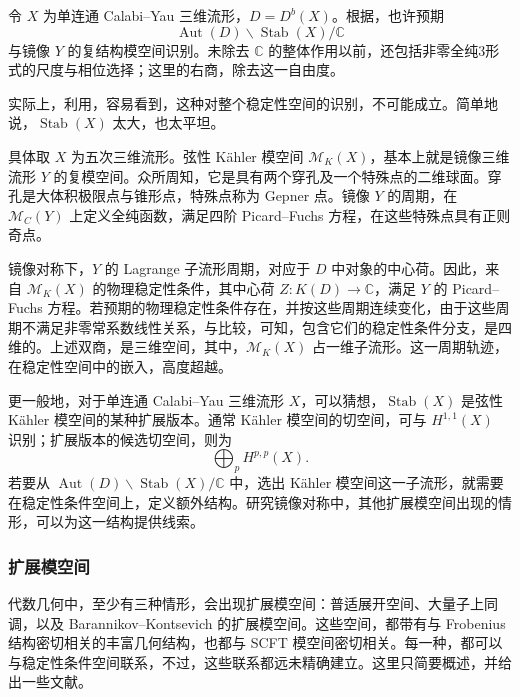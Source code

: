 令 $X$ 为单连通 Calabi--Yau 三维流形，$D=D^b(X)$。根据，也许预期
\[
\operatorname{Aut}(D)\backslash\operatorname{Stab}(X)/\mathbb{C}
\]
与镜像 $Y$ 的复结构模空间识别。未除去 $\mathbb{C}$ 的整体作用以前，还包括非零全纯3形式的尺度与相位选择；这里的右商，除去这一自由度。

实际上，利用，容易看到，这种对整个稳定性空间的识别，不可能成立。简单地说，$\operatorname{Stab}(X)$ 太大，也太平坦。

具体取 $X$ 为五次三维流形。弦性 K\"ahler 模空间 $\mathcal{M}_K(X)$，基本上就是镜像三维流形 $Y$ 的复模空间。众所周知，它是具有两个穿孔及一个特殊点的二维球面。穿孔是大体积极限点与锥形点，特殊点称为 Gepner 点。镜像 $Y$ 的周期，在 $\mathcal{M}_C(Y)$ 上定义全纯函数，满足四阶 Picard--Fuchs 方程，在这些特殊点具有正则奇点。

镜像对称下，$Y$ 的 Lagrange 子流形周期，对应于 $D$ 中对象的中心荷。因此，来自 $\mathcal{M}_K(X)$ 的物理稳定性条件，其中心荷 $Z\colon K(D)\to\mathbb{C}$，满足 $Y$ 的 Picard--Fuchs 方程。若预期的物理稳定性条件存在，并按这些周期连续变化，由于这些周期不满足非零常系数线性关系，与比较，可知，包含它们的稳定性条件分支，是四维的。上述双商，是三维空间，其中，$\mathcal{M}_K(X)$ 占一维子流形。这一周期轨迹，在稳定性空间中的嵌入，高度超越。

更一般地，对于单连通 Calabi--Yau 三维流形 $X$，可以猜想，$\operatorname{Stab}(X)$ 是弦性 K\"ahler 模空间的某种扩展版本。通常 K\"ahler 模空间的切空间，可与 $H^{1,1}(X)$ 识别；扩展版本的候选切空间，则为
\[
\bigoplus_p H^{p,p}(X).
\]
若要从 $\operatorname{Aut}(D)\backslash\operatorname{Stab}(X)/\mathbb{C}$ 中，选出 K\"ahler 模空间这一子流形，就需要在稳定性条件空间上，定义额外结构。研究镜像对称中，其他扩展模空间出现的情形，可以为这一结构提供线索。

\subsubsection{扩展模空间}\label{sec:5.9.1.3}

代数几何中，至少有三种情形，会出现扩展模空间：普适展开空间、大量子上同调，以及 Barannikov--Kontsevich 的扩展模空间。这些空间，都带有与 Frobenius 结构密切相关的丰富几何结构，也都与 SCFT 模空间密切相关。每一种，都可以与稳定性条件空间联系，不过，这些联系都远未精确建立。这里只简要概述，并给出一些文献。

